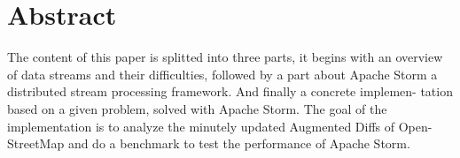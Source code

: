 \chapter*{Abstract}
The content of this paper is splitted into three parts, it begins with an overview
of data streams and their difficulties, followed by a part about Apache Storm
a distributed stream processing framework. And finally a concrete implemen-
tation based on a given problem, solved with Apache Storm. The goal of the
implementation is to analyze the minutely updated Augmented Diffs of Open-
StreetMap and do a benchmark to test the performance of Apache Storm.

